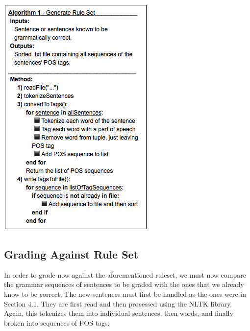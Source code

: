 \documentclass[11pt,a4paper]{article}
\newenvironment{Figure}
  {\par\medskip\noindent\minipage{\linewidth}}
  {\endminipage\par\medskip}
\begin{document}
\begin{multicols}{2}
\begin{Figure}  
   \centering
   \includegraphics[width=\linewidth]{GenerateAlgorithm}
\end{Figure}   

\subsection{Grading Against Rule Set}
In order to grade now against the aforementioned ruleset, we must now compare the grammar sequences of sentences to be graded with the ones that we already know to be correct. The new sentences must first be handled as the ones were in Section 4.1. They are first read and then processed using the NLTK library. Again, this tokenizes them into individual sentences, then words, and finally broken into sequences of POS tags.


\end{multicols}
\end{document}
